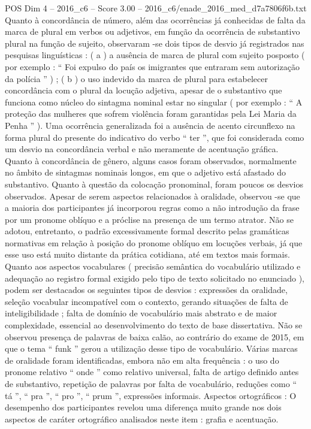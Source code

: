 \begin{textsample}{POS Dim 4 – 2016\_c6 – Score 3.00 – 2016\_c6/enade\_2016\_med\_d7a7806f6b.txt}
Quanto à concordância de número, além das ocorrências já conhecidas de falta da marca de plural em verbos ou adjetivos, em função da ocorrência de substantivo plural na função de sujeito, observaram -se dois tipos de desvio já registrados nas pesquisas linguísticas : ( a ) a ausência de marca de plural com sujeito posposto ( por exemplo : “ Foi expulso do país os imigrantes que entraram sem autorização da polícia ” ) ; ( b ) o uso indevido da marca de plural para estabelecer concordância com o plural da locução adjetiva, apesar de o substantivo que funciona como núcleo do sintagma nominal estar no singular ( por exemplo : “ A proteção das mulheres que sofrem violência foram garantidas pela Lei Maria da Penha ” ).
Uma ocorrência generalizada foi a ausência de acento circunflexo na forma plural do presente do indicativo do verbo “ ter ”, que foi considerada como um desvio na concordância verbal e não meramente de acentuação gráfica.
Quanto à concordância de gênero, alguns casos foram observados, normalmente no âmbito de sintagmas nominais longos, em que o adjetivo está afastado do substantivo.
Quanto à questão da colocação pronominal, foram poucos os desvios observados.
Apesar de serem aspectos relacionados à oralidade, observou -se que a maioria dos participantes já incorporou regras como a não introdução da frase por um pronome oblíquo e a próclise na presença de um termo atrator.
Não se adotou, entretanto, o padrão excessivamente formal descrito pelas gramáticas normativas em relação à posição do pronome oblíquo em locuções verbais, já que esse uso está muito distante da prática cotidiana, até em textos mais formais.
Quanto aos aspectos vocabulares ( precisão semântica do vocabulário utilizado e adequação ao registro formal exigido pelo tipo de texto solicitado no enunciado ), podem ser destacados os seguintes tipos de desvios : expressões da oralidade, seleção vocabular incompatível com o contexto, gerando situações de falta de inteligibilidade ; falta de domínio de vocabulário mais abstrato e de maior complexidade, essencial ao desenvolvimento do texto de base dissertativa.
Não se observou presença de palavras de baixa calão, ao contrário do exame de 2015, em que o tema “ funk ” gerou a utilização desse tipo de vocabulário.
Várias marcas de oralidade foram identificadas, embora não em alta frequência : o uso do pronome relativo “ onde ” como relativo universal, falta de artigo definido antes de substantivo, repetição de palavras por falta de vocabulário, reduções como “ tá ”, “ pra ”, “ pro ”, “ prum ”, expressões informais.
Aspectos ortográficos : O desempenho dos participantes revelou uma diferença muito grande nos dois aspectos de caráter ortográfico analisados neste item : grafia e acentuação.

\end{textsample}
